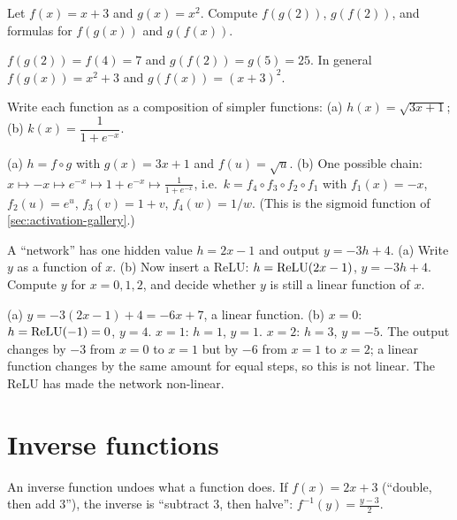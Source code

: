 \sectionexercises

\begin{exercise}
Let $f(x) = x + 3$ and $g(x) = x^2$. Compute $f(g(2))$, $g(f(2))$, and
formulas for $f(g(x))$ and $g(f(x))$.
\end{exercise}
\begin{solution}
$f(g(2)) = f(4) = 7$ and $g(f(2)) = g(5) = 25$. In general
$f(g(x)) = x^2 + 3$ and $g(f(x)) = (x+3)^2$.
\end{solution}

\begin{exercise}
Write each function as a composition of simpler functions:
(a) $h(x) = \sqrt{3x + 1}$; (b) $k(x) = \dfrac{1}{1 + e^{-x}}$.
\end{exercise}
\begin{solution}
(a) $h = f \circ g$ with $g(x) = 3x + 1$ and $f(u) = \sqrt u$.
(b) One possible chain: $x \mapsto -x \mapsto e^{-x} \mapsto 1 + e^{-x}
\mapsto \frac{1}{1 + e^{-x}}$, i.e.\ $k = f_4 \circ f_3 \circ f_2 \circ f_1$ with
$f_1(x) = -x$, $f_2(u) = e^u$, $f_3(v) = 1 + v$, $f_4(w) = 1/w$. (This is the
sigmoid function of \cref{sec:activation-gallery}.)
\end{solution}

\begin{exercise}
A ``network'' has one hidden value $h = 2x - 1$ and output $y = -3h + 4$.
(a) Write $y$ as a function of $x$. (b) Now insert a ReLU:
$h = \operatorname{ReLU}(2x - 1)$, $y = -3h + 4$. Compute $y$ for $x = 0, 1, 2$, and decide
whether $y$ is still a linear function of $x$.
\end{exercise}
\begin{solution}
(a) $y = -3(2x - 1) + 4 = -6x + 7$, a linear function.
(b) $x = 0$: $h = \operatorname{ReLU}(-1) = 0$, $y = 4$. $x = 1$: $h = 1$, $y = 1$. $x = 2$:
$h = 3$, $y = -5$. The output changes by $-3$ from $x=0$ to $x=1$ but by $-6$
from $x=1$ to $x=2$; a linear function changes by the same amount for equal
steps, so this is not linear. The ReLU has made the network non-linear.
\end{solution}

\section{Inverse functions}\label{sec:inverse-functions}

An inverse function undoes what a function does. If $f(x) = 2x + 3$ (``double,
then add $3$''), the inverse is ``subtract $3$, then halve'':
$f^{-1}(y) = \frac{y - 3}{2}$.

